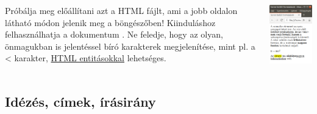 \documentclass[usenames,dvipsnames,aspectratio=169]{beamer}
\newcommand{\kiemel}[1]{{\color{kiemelesszin}#1}}
\newcommand{\hiv}[1]{{\color{hivatkozasszin}#1}}
\begin{document}
\begin{frame}
  \begin{columns}[c]
      Próbálja meg előállítani azt a HTML fájlt, ami a jobb oldalon látható módon jelenik meg a böngészőben!
      Kiinduláshoz felhasználhatja a dokumentum .
      Ne feledje, hogy az olyan, önmagukban is jelentéssel bíró karakterek megjelenítése, mint pl. a \kiemel{<}
      karakter, \hiv{\href{https://en.wikipedia.org/wiki/List_of_XML_and_HTML_character_entity_references\#Character_entity_references_in_HTML}{HTML entitásokkal}} lehetséges.
      \begin{center}
        \begin{exampleblock}{}
          \centering \includegraphics[scale=.35]{soronbelul.png}
        \end{exampleblock}
      \end{center}
  \end{columns}
\end{frame}

\subsection{Idézés, címek, írásirány}
\end{document}
